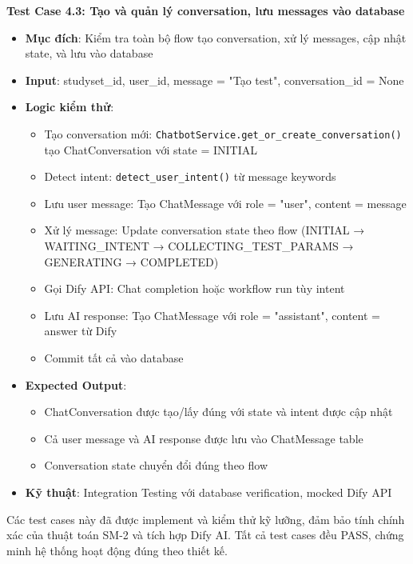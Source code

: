 \documentclass[../DoAn.tex]{subfiles}
\begin{document}
\textbf{Test Case 4.3: Tạo và quản lý conversation, lưu messages vào database}
\begin{itemize}
    \item \textbf{Mục đích}: Kiểm tra toàn bộ flow tạo conversation, xử lý messages, cập nhật state, và lưu vào database
    \item \textbf{Input}: studyset\_id, user\_id, message = "Tạo test", conversation\_id = None
    \item \textbf{Logic kiểm thử}: 
    \begin{itemize}
        \item Tạo conversation mới: \texttt{ChatbotService.get\_or\_create\_conversation()} tạo ChatConversation với state = INITIAL
        \item Detect intent: \texttt{detect\_user\_intent()} từ message keywords
        \item Lưu user message: Tạo ChatMessage với role = "user", content = message
        \item Xử lý message: Update conversation state theo flow (INITIAL → WAITING\_INTENT → COLLECTING\_TEST\_PARAMS → GENERATING → COMPLETED)
        \item Gọi Dify API: Chat completion hoặc workflow run tùy intent
        \item Lưu AI response: Tạo ChatMessage với role = "assistant", content = answer từ Dify
        \item Commit tất cả vào database
    \end{itemize}
    \item \textbf{Expected Output}: 
    \begin{itemize}
        \item ChatConversation được tạo/lấy đúng với state và intent được cập nhật
        \item Cả user message và AI response được lưu vào ChatMessage table
        \item Conversation state chuyển đổi đúng theo flow
    \end{itemize}
    \item \textbf{Kỹ thuật}: Integration Testing với database verification, mocked Dify API
\end{itemize}

Các test cases này đã được implement và kiểm thử kỹ lưỡng, đảm bảo tính chính xác của thuật toán SM-2 và tích hợp Dify AI. Tất cả test cases đều PASS, chứng minh hệ thống hoạt động đúng theo thiết kế.
\end{document}
